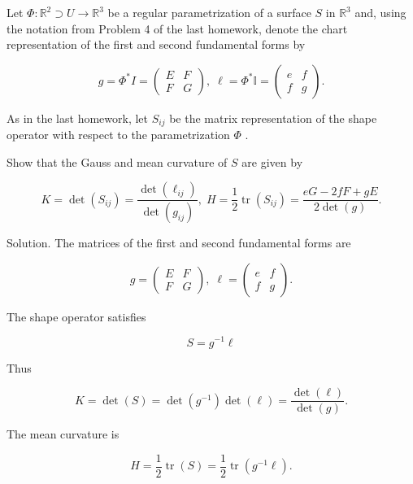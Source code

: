 \documentclass[10pt]{article}
\begin{document}
\begin{problem}[title=PROBLEM 1 (4 POINTS)]
Let \(\Phi  : {\mathbb{R}}^{2} \supset  U \rightarrow  {\mathbb{R}}^{3}\) be a regular parametrization of a surface \(S\) in \({\mathbb{R}}^{3}\) and, using the notation from Problem 4 of the last homework, denote the chart representation of the first and second fundamental forms by

\[
g = {\Phi }^{ * }I = \left( \begin{array}{ll} E & F \\  F & G \end{array}\right) ,\;\ell  = {\Phi }^{ * }\mathbb{I} = \left( \begin{array}{ll} e & f \\  f & g \end{array}\right) .
\]

As in the last homework, let \({S}_{ij}\) be the matrix representation of the shape operator with respect to the parametrization \(\Phi\) .

Show that the Gauss and mean curvature of \(S\) are given by

\[
K = \det \left( {S}_{ij}\right)  = \frac{\det \left( {\ell }_{ij}\right) }{\det \left( {g}_{ij}\right) },\;H = \frac{1}{2}\operatorname{tr}\left( {S}_{ij}\right)  = \frac{{eG} - {2fF} + {gE}}{2\det \left( g\right) }.
\]
\end{problem}

Solution. The matrices of the first and second fundamental forms are

\[
g = \left( \begin{array}{ll} E & F \\  F & G \end{array}\right) ,\;\ell  = \left( \begin{array}{ll} e & f \\  f & g \end{array}\right) .
\]

The shape operator satisfies

\[
S = {g}^{-1}\ell
\]

Thus

\[
K = \det \left( S\right)  = \det \left( {g}^{-1}\right) \det \left( \ell \right)  = \frac{\det \left( \ell \right) }{\det \left( g\right) }.
\]

The mean curvature is

\[
H = \frac{1}{2}\operatorname{tr}\left( S\right)  = \frac{1}{2}\operatorname{tr}\left( {{g}^{-1}\ell }\right) .
\]
\end{document}
